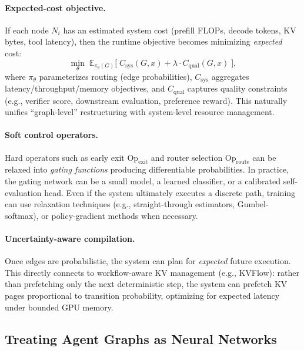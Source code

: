 \paragraph{Expected-cost objective.}
If each node $N_i$ has an estimated system cost (prefill FLOPs, decode tokens, KV bytes, tool latency), then the runtime objective becomes minimizing \emph{expected} cost:
\[
\min_{\theta}\; \mathbb{E}_{\pi_\theta(G)}\bigl[\; C_{\mathrm{sys}}(G, x) + \lambda \cdot C_{\mathrm{qual}}(G, x)\;\bigr],
\]
where $\pi_\theta$ parameterizes routing (edge probabilities), $C_{\mathrm{sys}}$ aggregates latency/throughput/memory objectives, and $C_{\mathrm{qual}}$ captures quality constraints (e.g., verifier score, downstream evaluation, preference reward). This naturally unifies ``graph-level'' restructuring with system-level resource management.

\paragraph{Soft control operators.}
Hard operators such as early exit $\mathrm{Op}_{\mathrm{exit}}$ and router selection $\mathrm{Op}_{\mathrm{route}}$ can be relaxed into \emph{gating functions} producing differentiable probabilities. In practice, the gating network can be a small model, a learned classifier, or a calibrated self-evaluation head. Even if the system ultimately executes a discrete path, training can use relaxation techniques (e.g., straight-through estimators, Gumbel-softmax), or policy-gradient methods when necessary.

\paragraph{Uncertainty-aware compilation.}
Once edges are probabilistic, the system can plan for \emph{expected} future execution. This directly connects to workflow-aware KV management (e.g., KVFlow): rather than prefetching only the next deterministic step, the system can prefetch KV pages proportional to transition probability, optimizing for expected latency under bounded GPU memory.

\subsection{Treating Agent Graphs as Neural Networks}
\label{sec:graph_as_nn}

